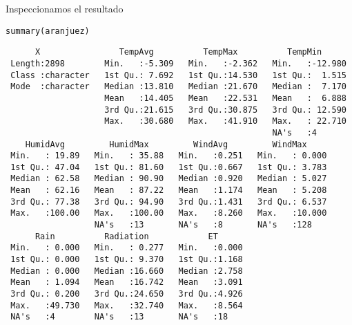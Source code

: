 \documentclass[aspectratio=169, usenames,svgnames,dvipsnames]{beamer}
\begin{document}
\begin{frame}[label={sec:org2ee67bd},fragile]{Inspeccionamos el resultado}
 \lstset{language=r,label= ,caption= ,captionpos=b,numbers=none}
\begin{lstlisting}
summary(aranjuez)
\end{lstlisting}

\begin{verbatim}
      X                TempAvg          TempMax          TempMin       
 Length:2898        Min.   :-5.309   Min.   :-2.362   Min.   :-12.980  
 Class :character   1st Qu.: 7.692   1st Qu.:14.530   1st Qu.:  1.515  
 Mode  :character   Median :13.810   Median :21.670   Median :  7.170  
                    Mean   :14.405   Mean   :22.531   Mean   :  6.888  
                    3rd Qu.:21.615   3rd Qu.:30.875   3rd Qu.: 12.590  
                    Max.   :30.680   Max.   :41.910   Max.   : 22.710  
                                                      NA's   :4        
    HumidAvg         HumidMax         WindAvg         WindMax      
 Min.   : 19.89   Min.   : 35.88   Min.   :0.251   Min.   : 0.000  
 1st Qu.: 47.04   1st Qu.: 81.60   1st Qu.:0.667   1st Qu.: 3.783  
 Median : 62.58   Median : 90.90   Median :0.920   Median : 5.027  
 Mean   : 62.16   Mean   : 87.22   Mean   :1.174   Mean   : 5.208  
 3rd Qu.: 77.38   3rd Qu.: 94.90   3rd Qu.:1.431   3rd Qu.: 6.537  
 Max.   :100.00   Max.   :100.00   Max.   :8.260   Max.   :10.000  
                  NA's   :13       NA's   :8       NA's   :128     
      Rain          Radiation            ET       
 Min.   : 0.000   Min.   : 0.277   Min.   :0.000  
 1st Qu.: 0.000   1st Qu.: 9.370   1st Qu.:1.168  
 Median : 0.000   Median :16.660   Median :2.758  
 Mean   : 1.094   Mean   :16.742   Mean   :3.091  
 3rd Qu.: 0.200   3rd Qu.:24.650   3rd Qu.:4.926  
 Max.   :49.730   Max.   :32.740   Max.   :8.564  
 NA's   :4        NA's   :13       NA's   :18
\end{verbatim}
\end{frame}
\end{document}
